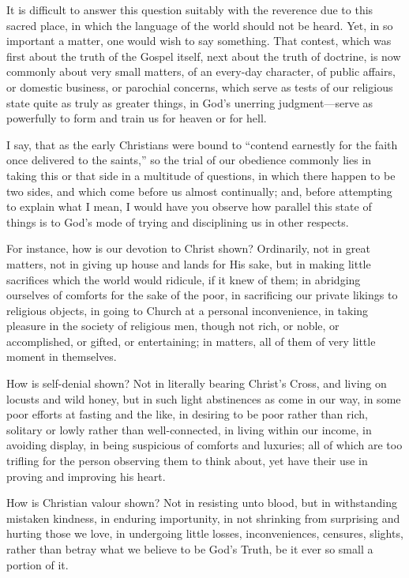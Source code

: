 It is difficult to answer this question suitably with the reverence
due to this sacred place, in which the language of the world should
not be heard. Yet, in so important a matter, one would wish to say
something. That contest, which was first about the truth of the Gospel
itself, next about the truth of doctrine, is now commonly about very
small matters, of an every-day character, of public affairs, or
domestic business, or parochial concerns, which serve as tests of our
religious state quite as truly as greater things, in God's unerring
judgment—serve as powerfully to form and train us for heaven or for hell.

I say, that as the early Christians were bound to ``contend
earnestly for the faith once delivered to the saints,'' so the
trial of our obedience commonly lies in taking this or that side in a
multitude of questions, in which there happen to be two sides, and
which come before us almost continually; and, before attempting to
explain what I mean, I would have you observe how parallel this state
of things is to God's mode of trying and disciplining us in other
respects.

For instance, how is our devotion to Christ shown? Ordinarily, not
in great matters, not in giving up house and lands for His sake, but
in making little sacrifices which the world would ridicule, if it knew
of them; in abridging ourselves of comforts for the sake of the poor,
in sacrificing our private likings to religious objects, in going to
Church at a personal inconvenience, in taking pleasure in the society
of religious men, though not rich, or noble, or accomplished, or
gifted, or entertaining; in matters, all of them of very little moment
in themselves.

How is self-denial shown? Not in literally bearing Christ's
Cross, and living on locusts and wild honey, but in such light
abstinences as come in our way, in some poor efforts at fasting and
the like, in desiring to be poor rather than rich, solitary or lowly
rather than well-connected, in living within our income, in avoiding
display, in being suspicious of comforts and luxuries; all of which
are too trifling for the person observing them to think about, yet
have their use in proving and improving his heart.

How is Christian valour shown? Not in resisting unto blood, but in
withstanding mistaken kindness, in enduring importunity, in not
shrinking from surprising and hurting those we love, in undergoing
little losses, inconveniences, censures, slights, rather than betray
what we believe to be God's Truth, be it ever so small a portion of
it.

